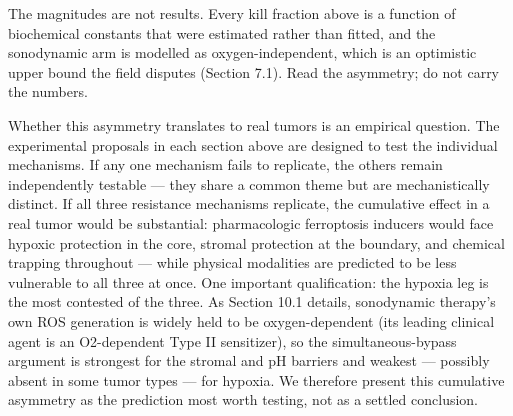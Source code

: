 \documentclass[11pt,twoside,openright]{report}
\begin{document}
\begin{refusal}
The magnitudes are not results. Every kill fraction above is a function of biochemical constants that were estimated rather than fitted, and the sonodynamic arm is modelled as oxygen-independent, which is an optimistic upper bound the field disputes (Section 7.1). Read the asymmetry; do not carry the numbers.
\end{refusal}

Whether this asymmetry translates to real tumors is an empirical question. The experimental proposals in each section above are designed to test the individual mechanisms. If any one mechanism fails to replicate, the others remain independently testable --- they share a common theme but are mechanistically distinct. If all three resistance mechanisms replicate, the cumulative effect in a real tumor would be substantial: pharmacologic ferroptosis inducers would face hypoxic protection in the core, stromal protection at the boundary, and chemical trapping throughout --- while physical modalities are predicted to be less vulnerable to all three at once. One important qualification: the hypoxia leg is the most contested of the three. As Section 10.1 details, sonodynamic therapy's own ROS generation is widely held to be oxygen-dependent (its leading clinical agent is an O2-dependent Type II sensitizer), so the simultaneous-bypass argument is strongest for the stromal and pH barriers and weakest --- possibly absent in some tumor types --- for hypoxia. We therefore present this cumulative asymmetry as the prediction most worth testing, not as a settled conclusion.
\end{document}
